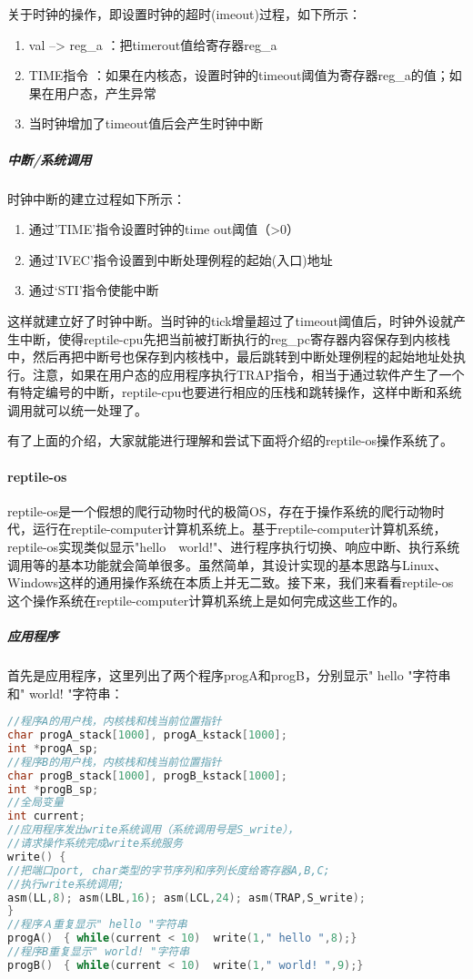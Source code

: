 关于时钟的操作，即设置时钟的超时(imeout)过程，如下所示：
\begin{enumerate}
\item val --> reg\_a  ：把timerout值给寄存器reg\_a
\item TIME指令 ：如果在内核态，设置时钟的timeout阈值为寄存器reg\_a的值；如果在用户态，产生异常
\item 当时钟增加了timeout值后会产生时钟中断
\end{enumerate}

\subparagraph{中断/系统调用}

时钟中断的建立过程如下所示：
\begin{enumerate}
\item 通过'TIME'指令设置时钟的time out阈值（>0）
\item 通过'IVEC'指令设置到中断处理例程的起始(入口)地址
\item 通过‘STI’指令使能中断
\end{enumerate}

这样就建立好了时钟中断。当时钟的tick增量超过了timeout阈值后，时钟外设就产生中断，使得reptile-cpu先把当前被打断执行的reg\_pc寄存器内容保存到内核栈中，然后再把中断号也保存到内核栈中，最后跳转到中断处理例程的起始地址处执行。注意，如果在用户态的应用程序执行TRAP指令，相当于通过软件产生了一个有特定编号的中断，reptile-cpu也要进行相应的压栈和跳转操作，这样中断和系统调用就可以统一处理了。

有了上面的介绍，大家就能进行理解和尝试下面将介绍的reptile-os操作系统了。

\paragraph{reptile-os}
reptile-os是一个假想的爬行动物时代的极简OS，存在于操作系统的爬行动物时代，运行在reptile-computer计算机系统上。基于reptile-computer计算机系统，reptile-os实现类似显示"hello　world!"、进行程序执行切换、响应中断、执行系统调用等的基本功能就会简单很多。虽然简单，其设计实现的基本思路与Linux、Windows这样的通用操作系统在本质上并无二致。接下来，我们来看看reptile-os这个操作系统在reptile-computer计算机系统上是如何完成这些工作的。

\subparagraph{应用程序}
首先是应用程序，这里列出了两个程序progA和progB，分别显示" hello "字符串和" world! "字符串：
 
 \begin{lstlisting}[language={C}]
//程序A的用户栈，内核栈和栈当前位置指针
char progA_stack[1000], progA_kstack[1000];
int *progA_sp;
//程序B的用户栈，内核栈和栈当前位置指针
char progB_stack[1000], progB_kstack[1000];
int *progB_sp;
//全局变量
int current;
//应用程序发出write系统调用（系统调用号是S_write），
//请求操作系统完成write系统服务
write() { 
//把端口port, char类型的字节序列和序列长度给寄存器A,B,C; 
//执行write系统调用; 
asm(LL,8); asm(LBL,16); asm(LCL,24); asm(TRAP,S_write);
}
//程序Ａ重复显示" hello "字符串
progA()　{ while(current < 10)  write(1," hello ",8);}
//程序B重复显示" world! "字符串
progB()　{ while(current < 10)  write(1," world! ",9);}
\end{lstlisting}

